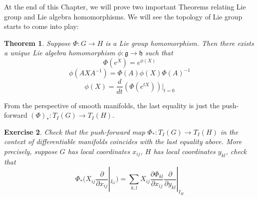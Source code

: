 \documentclass[11pt]{article}
\newtheorem{theorem}{Theorem}[section]
\newtheorem{exercise}[theorem]{Exercise}
\newcommand{\mf}[1]{\mathfrak{#1}}
\begin{document}
\noindent At the end of this Chapter, we will prove two important Theorems relating Lie group and Lie algebra homomorphisms. We will see the topology of Lie group starts to come into play:
\begin{theorem} \label{gptoalg}
Suppose $\Phi:G \to H$ is a Lie group homomorphism. Then there exists a unique Lie algebra homomorphism $\phi: \mf{g} \to \mf{h}$ such that
$$\Phi(e^X) = e^{\phi(X)}$$
$$\phi(AXA^{-1}) = \Phi(A) \phi(X) \Phi(A)^{-1}$$
$$\phi(X) = \frac{d}{dt}(\Phi(e^{tX}))|_{t=0}$$
\end{theorem}
From the perspective of smooth manifolds, the last equality is just the push-forward $(\Phi)_* : T_I(G) \to T_I(H)$.
\begin{exercise}
Check that the push-forward map $\Phi_* : T_I(G) \to T_I(H)$ in the context of differentiable manifolds coincides with the last equality above. More precisely, suppose $G$ has local coordinates $x_{ij}$, $H$ has local coordinates $y_{kl}$, check that
$$\Phi_*(X_{ij} \frac{\partial}{\partial x_{ij}}|_{I_G}) = \sum_{k,l} X_{ij} \frac{\partial \Phi_{kl}}{\partial x_{ij}} \frac{\partial}{\partial y_{kl}}|_{I_H}$$
\end{exercise}
\end{document}
